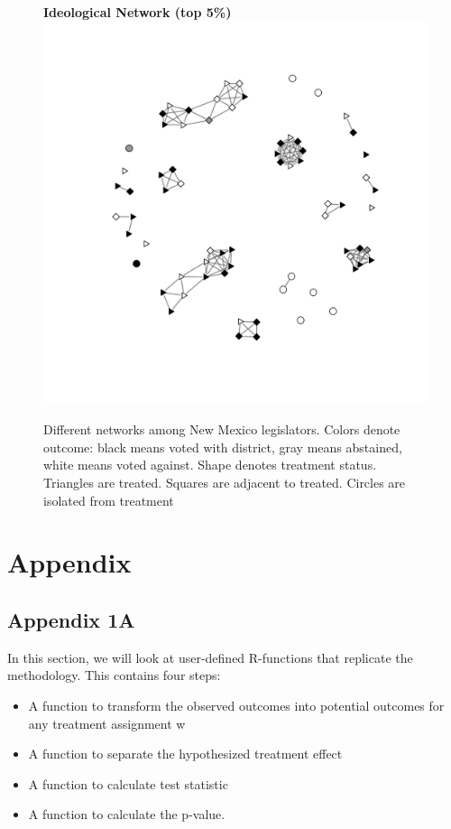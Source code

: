 \documentclass[12pt]{article}
\begin{document}
\begin{figure}
\begin{tabular}{cc}
\end{tabular}
{\bf Ideological Network (top 5\%)} \\
\includegraphics[scale=.55, clip=true,trim =2cm 2cm 2cm 2cm]{./images/coppock_ideological_net.pdf}
\caption{Different networks among New Mexico legislators. Colors denote outcome: black means voted with district, gray means abstained, white means voted against. Shape denotes treatment status. Triangles are treated. Squares are adjacent to treated. Circles are isolated from treatment}
\label{figure: nh-nets}
\end{figure}


\section{Appendix}
\subsection{Appendix 1A}

In this section, we will look at user-defined R-functions that replicate the \citet{bowers2012reasoning} methodology. This contains four steps:

\begin{itemize}
\item A function to transform the observed outcomes into potential outcomes for any treatment assignment w
\item A function to separate the hypothesized treatment effect
\item A function to calculate test statistic
\item A function to calculate the p-value.
\end{itemize}
\end{document}
